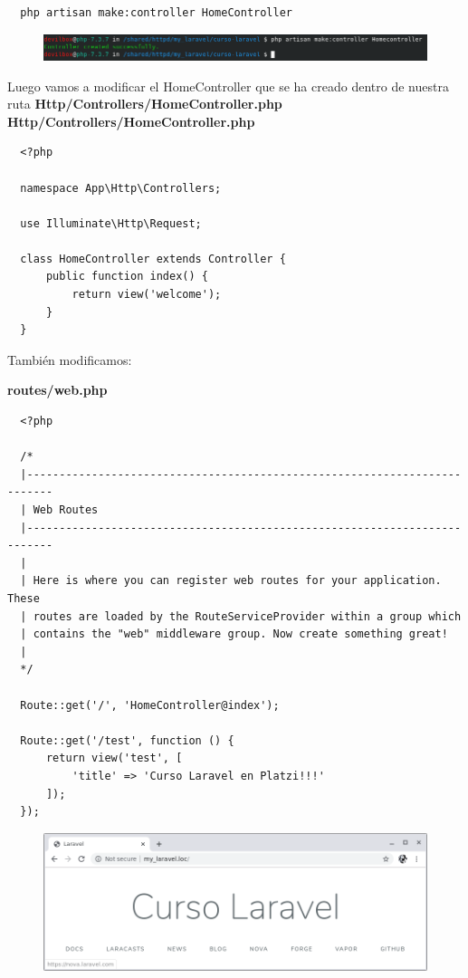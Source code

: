 \documentclass{article}
\begin{document}
\begin{verbatim}
  php artisan make:controller HomeController
\end{verbatim}

\begin{figure}[h!]
  \centering
  \includegraphics[scale=0.5]{./Pictures/011_artisar_make_controller.png}
\end{figure}

Luego vamos a modificar el HomeController que se ha creado dentro de nuestra
ruta  \textbf{Http/Controllers/HomeController.php}\\

\textbf{Http/Controllers/HomeController.php}
\begin{verbatim}
  <?php

  namespace App\Http\Controllers;

  use Illuminate\Http\Request;

  class HomeController extends Controller {
      public function index() {
          return view('welcome');
      }
  }
\end{verbatim}

También modificamos:

\textbf{routes/web.php}
\begin{verbatim}
  <?php

  /*
  |--------------------------------------------------------------------------
  | Web Routes
  |--------------------------------------------------------------------------
  |
  | Here is where you can register web routes for your application. These
  | routes are loaded by the RouteServiceProvider within a group which
  | contains the "web" middleware group. Now create something great!
  |
  */

  Route::get('/', 'HomeController@index');

  Route::get('/test', function () {
      return view('test', [
          'title' => 'Curso Laravel en Platzi!!!'
      ]);
  });
\end{verbatim}

\begin{figure}[h!]
  \centering
  \includegraphics[scale=0.5]{./Pictures/012_homeController.png}
\end{figure}
\end{document}
